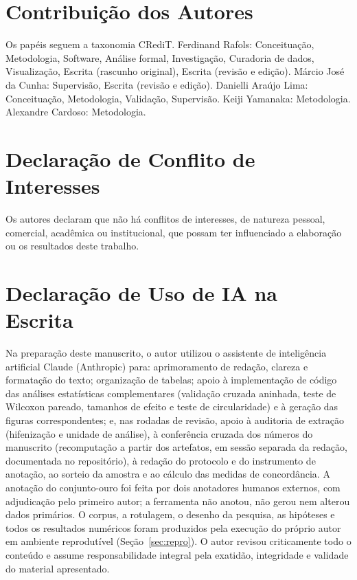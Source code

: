 \documentclass[fleqn,10pt]{SelfArx}
\begin{document}
\section*{Contribuição dos Autores}
Os papéis seguem a taxonomia CRediT. Ferdinand Rafols: Conceituação, Metodologia, Software, Análise formal, Investigação, Curadoria de dados, Visualização, Escrita (rascunho original), Escrita (revisão e edição). Márcio José da Cunha: Supervisão, Escrita (revisão e edição). Danielli Araújo Lima: Conceituação, Metodologia, Validação, Supervisão. Keiji Yamanaka: Metodologia. Alexandre Cardoso: Metodologia.

\section*{Declaração de Conflito de Interesses}
Os autores declaram que não há conflitos de interesses, de natureza pessoal, comercial, acadêmica ou institucional, que possam ter influenciado a elaboração ou os resultados deste trabalho.

\section*{Declaração de Uso de IA na Escrita}
Na preparação deste manuscrito, o autor utilizou o assistente de inteligência artificial Claude (Anthropic) para: aprimoramento de redação, clareza e formatação do texto; organização de tabelas; apoio à implementação de código das análises estatísticas complementares (validação cruzada aninhada, teste de Wilcoxon pareado, tamanhos de efeito e teste de circularidade) e à geração das figuras correspondentes; e, nas rodadas de revisão, apoio à auditoria de extração (hifenização e unidade de análise), à conferência cruzada dos números do manuscrito (recomputação a partir dos artefatos, em sessão separada da redação, documentada no repositório), à redação do protocolo e do instrumento de anotação, ao sorteio da amostra e ao cálculo das medidas de concordância. A anotação do conjunto-ouro foi feita por dois anotadores humanos externos, com adjudicação pelo primeiro autor; a ferramenta não anotou, não gerou nem alterou dados primários. O corpus, a rotulagem, o desenho da pesquisa, as hipóteses e todos os resultados numéricos foram produzidos pela execução do próprio autor em ambiente reprodutível (Seção~\ref{sec:repro}). O autor revisou criticamente todo o conteúdo e assume responsabilidade integral pela exatidão, integridade e validade do material apresentado.

\balance


\end{document}
